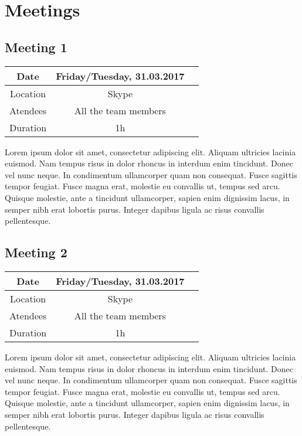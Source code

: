 
\chapter{Meetings} %

\label{Meetings} %


\section{Meeting 1}
\begin{center}
\begin{tabular}{| c | c | c }
	\hline
	Date & Friday/Tuesday, 	31.03.2017   \\
	\hline
	Location & Skype  \\  
	\hline
	Atendees & All the team members   \\
	\hline
	Duration & 1h  \\
	\hline
\end{tabular}	
\end{center}


Lorem ipsum dolor sit amet, consectetur adipiscing elit. Aliquam ultricies lacinia euismod. Nam tempus risus in dolor rhoncus in interdum enim tincidunt. Donec vel nunc neque. In condimentum ullamcorper quam non consequat. Fusce sagittis tempor feugiat. Fusce magna erat, molestie eu convallis ut, tempus sed arcu. Quisque molestie, ante a tincidunt ullamcorper, sapien enim dignissim lacus, in semper nibh erat lobortis purus. Integer dapibus ligula ac risus convallis pellentesque.

\section{Meeting 2}
\begin{center}
	\begin{tabular}{| c | c | c }
		\hline
		Date & Friday/Tuesday, 	31.03.2017   \\
		\hline
		Location & Skype  \\  
		\hline
		Atendees & All the team members   \\
		\hline
		Duration & 1h  \\
		\hline
	\end{tabular}	
\end{center}


Lorem ipsum dolor sit amet, consectetur adipiscing elit. Aliquam ultricies lacinia euismod. Nam tempus risus in dolor rhoncus in interdum enim tincidunt. Donec vel nunc neque. In condimentum ullamcorper quam non consequat. Fusce sagittis tempor feugiat. Fusce magna erat, molestie eu convallis ut, tempus sed arcu. Quisque molestie, ante a tincidunt ullamcorper, sapien enim dignissim lacus, in semper nibh erat lobortis purus. Integer dapibus ligula ac risus convallis pellentesque.